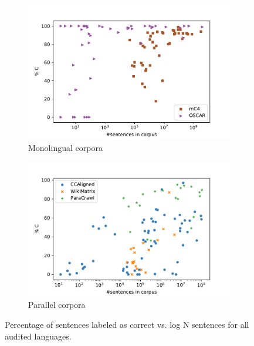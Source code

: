 \begin{figure}[th]
    \centering
    \begin{subfigure}{.5\textwidth}
        \centering
        \includegraphics[width=\linewidth]{static/media/oscar/quality/C_mono.pdf}
        \caption{Monolingual corpora}
        \label{fig:C_mono}
    \end{subfigure}%
    \begin{subfigure}{.5\textwidth}
        \centering
        \includegraphics[width=\linewidth]{static/media/oscar/quality/C_para.pdf}
        \caption{Parallel corpora}
        \label{fig:C_para}
    \end{subfigure}
    \caption{Percentage of sentences labeled as correct vs. log N sentences for all audited languages.}
    \label{fig:C}
\end{figure}

